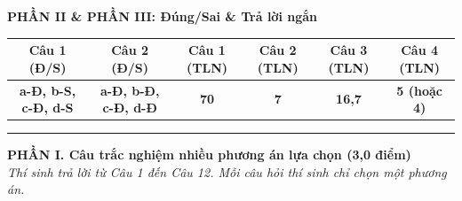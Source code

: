 \documentclass[11pt,a4paper]{article}
\begin{document}
\textbf{\color{mainGreen}PHẦN II \& PHẦN III: Đúng/Sai \& Trả lời ngắn}
\begin{center}
\small
\begin{tabular}{|c|c|c|c|c|c|}
\hline
\rowcolor{tableGreen}
\textbf{Câu 1 (Đ/S)} & \textbf{Câu 2 (Đ/S)} & \textbf{Câu 1 (TLN)} & \textbf{Câu 2 (TLN)} & \textbf{Câu 3 (TLN)} & \textbf{Câu 4 (TLN)} \\
\hline
\textbf{\color{ansRed}a-Đ, b-S, c-Đ, d-S} & \textbf{\color{ansRed}a-Đ, b-Đ, c-Đ, d-Đ} & \textbf{\color{ansRed}70} & \textbf{\color{ansRed}7} & \textbf{\color{ansRed}16,7} & \textbf{\color{ansRed}5 (hoặc 4)} \\
\hline
\end{tabular}
\end{center}
\par\vspace{-2pt}\noindent\textcolor{hfGreen}{\rule{\textwidth}{0.75pt}}\par\vspace{4pt}


\noindent\textbf{\large\color{mainGreen}PHẦN I. Câu trắc nghiệm nhiều phương án lựa chọn (3,0 điểm)}\\
\textit{Thí sinh trả lời từ Câu 1 đến Câu 12. Mỗi câu hỏi thí sinh chỉ chọn một phương án.}
\vspace{4pt}
\end{document}
